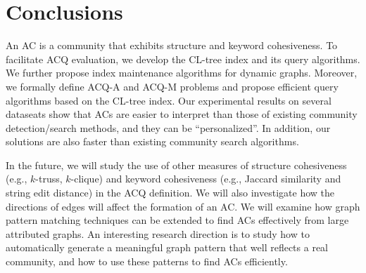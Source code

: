 \section{Conclusions}
\label{conclusion}

An AC is a community that exhibits structure and keyword cohesiveness. To facilitate ACQ evaluation, we develop the CL-tree index and its query algorithms. We further propose index maintenance algorithms for dynamic graphs.
Moreover, we formally define ACQ-A and ACQ-M problems and propose efficient query algorithms based on the CL-tree index.
Our experimental results on several dataseats show that ACs are easier to interpret than those of existing community detection/search methods, and they can be ``personalized''. In addition, our solutions are also faster than existing community search algorithms.

In the future, we will study the use of other measures of structure cohesiveness (e.g., $k$-truss, $k$-clique) and keyword cohesiveness (e.g., Jaccard similarity and string edit distance) in the ACQ definition.
We will also investigate how the directions of edges will affect the formation of an AC.
We will examine how graph pattern matching techniques \cite{GPM-KDD2007,GPM-VLDB2010,GPM-PVLDB2015} can be extended to find ACs effectively from large attributed graphs. An interesting research direction is to study how to automatically generate a meaningful graph pattern that well reflects a real community, and how to use these patterns to find ACs efficiently. 